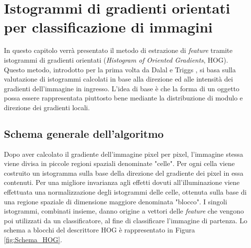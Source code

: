 
\chapter{Istogrammi di gradienti orientati per classificazione di immagini} %
\label{cap:hog}

In questo capitolo verrà presentato il metodo di estrazione di \emph{feature} tramite istogrammi di gradienti orientati (\emph{Histogram of Oriented Gradients}, HOG). Questo metodo, introdotto per la prima volta da Dalal e Triggs \citep{Art_HOGHuman}, si basa sulla valutazione di istogrammi calcolati in base alla direzione ed alle intensità dei gradienti dell'immagine in ingresso. L'idea di base è che la forma di un oggetto possa essere rappresentata piuttosto bene mediante la distribuzione di modulo e direzione dei gradienti locali. 
\clearpage

\section{Schema generale dell'algoritmo}
Dopo aver calcolato il gradiente dell'immagine pixel per pixel, l'immagine stessa viene divisa in piccole regioni spaziali denominate "celle". Per ogni cella viene costruito un istogramma sulla base della direzione del gradiente dei  pixel in essa contenuti. Per una migliore invarianza agli effetti dovuti all'illuminazione viene effettuata una normalizzazione degli istogrammi delle celle, ottenuta sulla base di una regione spaziale di dimensione maggiore denominata "blocco". I singoli istogrammi, combinati insieme, danno origine a vettori delle \emph{feature} che vengono poi utilizzati da un classificatore, al fine di classificare l'immagine di partenza. Lo schema a blocchi del descrittore HOG è rappresentato in Figura \ref{fig:Schema_HOG}.
 \\

